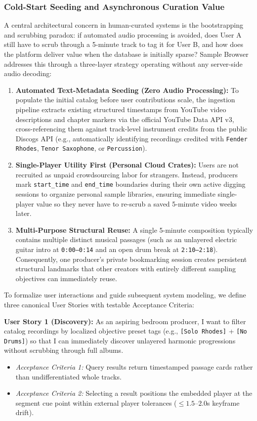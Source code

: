 \subsubsection*{Cold-Start Seeding and Asynchronous Curation Value}
A central architectural concern in human-curated systems is the bootstrapping and scrubbing paradox: if automated audio processing is avoided, does User A still have to scrub through a 5-minute track to tag it for User B, and how does the platform deliver value when the database is initially sparse? Sample Browser addresses this through a three-layer strategy operating without any server-side audio decoding:
\begin{enumerate}
    \item \textbf{Automated Text-Metadata Seeding (Zero Audio Processing):} To populate the initial catalog before user contributions scale, the ingestion pipeline extracts existing structured timestamps from YouTube video descriptions and chapter markers via the official YouTube Data API v3, cross-referencing them against track-level instrument credits from the public Discogs API (e.g., automatically identifying recordings credited with \texttt{Fender Rhodes}, \texttt{Tenor Saxophone}, or \texttt{Percussion}).
    \item \textbf{Single-Player Utility First (Personal Cloud Crates):} Users are not recruited as unpaid crowdsourcing labor for strangers. Instead, producers mark \texttt{start\_time} and \texttt{end\_time} boundaries during their own active digging sessions to organize personal sample libraries, ensuring immediate single-player value so they never have to re-scrub a saved 5-minute video weeks later.
    \item \textbf{Multi-Purpose Structural Reuse:} A single 5-minute composition typically contains multiple distinct musical passages (such as an unlayered electric guitar intro at \texttt{0:00--0:14} and an open drum break at \texttt{2:10--2:18}). Consequently, one producer's private bookmarking session creates persistent structural landmarks that other creators with entirely different sampling objectives can immediately reuse.
\end{enumerate}

To formalize user interactions and guide subsequent system modeling, we define three canonical User Stories with testable Acceptance Criteria:

\vspace{0.5em}
\noindent\textbf{User Story 1 (Discovery):} As an aspiring bedroom producer, I want to filter catalog recordings by localized objective preset tags (e.g., \texttt{[Solo Rhodes]} + \texttt{[No Drums]}) so that I can immediately discover unlayered harmonic progressions without scrubbing through full albums.
\begin{itemize}[leftmargin=1.5cm, nosep]
    \item \textit{Acceptance Criteria 1:} Query results return timestamped passage cards rather than undifferentiated whole tracks.
    \item \textit{Acceptance Criteria 2:} Selecting a result positions the embedded player at the segment cue point within external player tolerances ($\le 1.5\text{--}2.0$s keyframe drift).
\end{itemize}

